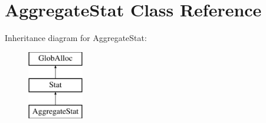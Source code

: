 \hypertarget{classAggregateStat}{\section{Aggregate\-Stat Class Reference}
\label{classAggregateStat}
}
Inheritance diagram for Aggregate\-Stat\-:\begin{figure}[H]
\begin{center}
\leavevmode
\includegraphics[height=3.000000cm]{classAggregateStat}
\end{center}
\end{figure}
